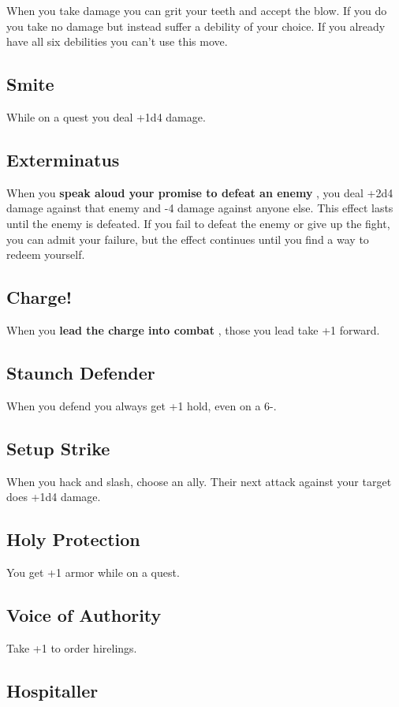 When you take damage you can grit your teeth and accept the blow. If you do you take no damage but instead suffer a debility of your choice. If you already have all six debilities you can't use this move.
\subsection{Smite}

While on a quest you deal +1d4 damage.
\subsection{Exterminatus}

When you \textbf{speak aloud your promise to defeat an enemy}
, you deal +2d4 damage against that enemy and -4 damage against anyone else. This effect lasts until the enemy is defeated. If you fail to defeat the enemy or give up the fight, you can admit your failure, but the effect continues until you find a way to redeem yourself.
\subsection{Charge!}

When you \textbf{lead the charge into combat}
, those you lead take +1 forward.
\subsection{Staunch Defender}

When you defend you always get +1 hold, even on a 6-.
\subsection{Setup Strike}

When you hack and slash, choose an ally. Their next attack against your target does +1d4 damage.
\subsection{Holy Protection}

You get +1 armor while on a quest.
\subsection{Voice of Authority}

Take +1 to order hirelings.
\subsection{Hospitaller}

